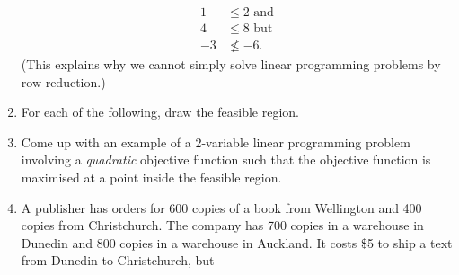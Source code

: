 \documentclass[a4paper,leqno]{article}
\numberwithin{equation}{section}
\theoremstyle{definition}
\theoremstyle{remark}
\begin{document}
\begin{enumerate}
        \begin{align*}
          1 &\leq 2 \text{ and}\\
          4 &\leq 8 \text{ but}\\
          -3 &\not\leq -6.
        \end{align*}
        (This explains why we cannot simply solve linear programming problems by row reduction.)
  \item For each of the following, draw the feasible region.
    \begin{center}
      \hspace*{\fill}
    \end{center}
  \item Come up with an example of a 2-variable linear programming problem involving a \emph{quadratic} objective function
        such that the objective function is maximised at a point inside the feasible region.
  \item A publisher has orders for 600 copies of a book from Wellington and 400 copies from Christchurch. The company has 700 copies in
        a warehouse in Dunedin and 800 copies in a warehouse in Auckland. It costs \$5 to ship a text from Dunedin to Christchurch, but

\end{enumerate}
\end{document}
